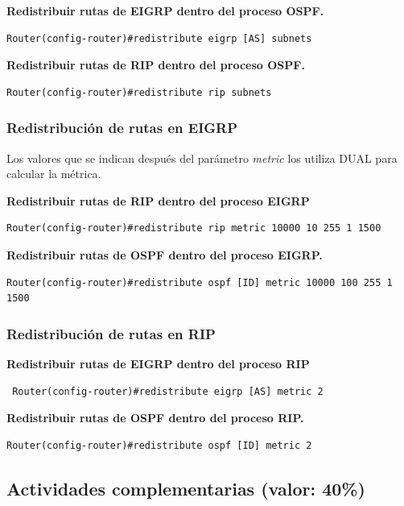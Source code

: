 \documentclass[12pt]{article}
\begin{document}
\textbf{Redistribuir  rutas de EIGRP dentro del proceso OSPF.}

\begin{lstlisting}
Router(config-router)#redistribute eigrp [AS] subnets 
\end{lstlisting}
\vspace{10px}
\textbf{Redistribuir rutas de RIP dentro del proceso OSPF.}
\begin{lstlisting}
Router(config-router)#redistribute rip subnets
\end{lstlisting}

\subsubsection{Redistribución de rutas en EIGRP}
Los valores que se indican después del parámetro \textit{metric} los utiliza DUAL para calcular la métrica.

\textbf{Redistribuir  rutas de RIP dentro del proceso EIGRP}
\begin{lstlisting}
Router(config-router)#redistribute rip metric 10000 10 255 1 1500
\end{lstlisting}
\vspace{10px}
\textbf{Redistribuir  rutas de OSPF dentro del proceso EIGRP.}
\begin{lstlisting}
Router(config-router)#redistribute ospf [ID] metric 10000 100 255 1 1500
\end{lstlisting}

\subsubsection{Redistribución de rutas en RIP}
\textbf{Redistribuir  rutas de EIGRP dentro del proceso RIP}
\begin{lstlisting}
 Router(config-router)#redistribute eigrp [AS] metric 2
\end{lstlisting}
\vspace{10px}
\textbf{Redistribuir  rutas de OSPF dentro del proceso RIP.}
\begin{lstlisting}
Router(config-router)#redistribute ospf [ID] metric 2
\end{lstlisting}
\vspace{15px}
\subsection{Actividades complementarias (valor: 40\%) }
\end{document}
